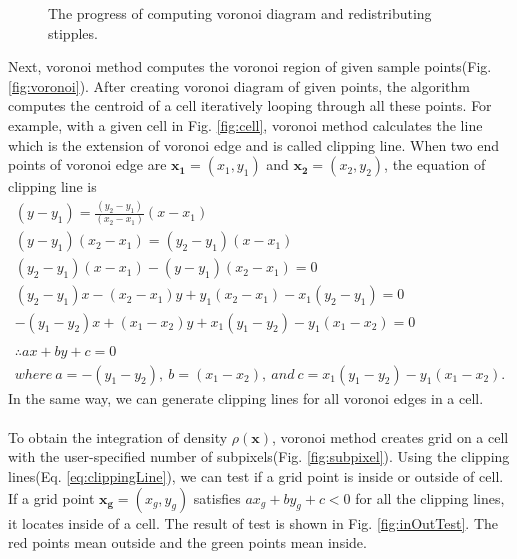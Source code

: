 \documentclass[11pt]{article}
\begin{document}
\begin{figure}[thb]
{    \label{fig:inOutTest}
  }\hspace{-3mm}
  \hspace{-3mm}
    \caption{The progress of computing voronoi diagram and redistributing stipples. \label{fig:createVoronoi}}
\end{figure}
Next, voronoi method computes the voronoi region of given sample points(Fig. \ref{fig:voronoi}).
After creating voronoi diagram of given points, the algorithm computes the centroid of a cell iteratively looping through all these points.
For example, with a given cell in Fig. \ref{fig:cell}, voronoi method calculates the line which is the extension of voronoi edge and is called clipping line.
When two end points of voronoi edge are $\mathbf{x_1}=(x_1,y_1)$ and $\mathbf{x_2}=(x_2,y_2)$, the equation of clipping line is
\begin{equation}\label{eq:clippingLine}
\begin{gathered}
(y-y_1) = \frac{(y_2-y_1)}{(x_2-x_1)}(x-x_1)\\
(y-y_1)(x_2-x_1) = (y_2-y_1)(x-x_1)\\
(y_2-y_1)(x-x_1)-(y-y_1)(x_2-x_1)= 0\\
(y_2-y_1)x-(x_2-x_1)y+y_1(x_2-x_1)-x_1(y_2-y_1)=0\\
-(y_1-y_2)x+(x_1-x_2)y+x_1(y_1-y_2)-y_1(x_1-x_2)=0\\\\
\therefore ax+by+c=0 \\where\:a=-(y_1-y_2),\:b=(x_1-x_2),\:and\:c=x_1(y_1-y_2)-y_1(x_1-x_2).
\end{gathered}
\end{equation}
In the same way, we can generate clipping lines for all voronoi edges in a cell.\\\\
To obtain the integration of density $\rho(\mathbf{x})$, voronoi method creates grid on a cell with the user-specified number of subpixels(Fig. \ref{fig:subpixel}).
Using the clipping lines(Eq. \ref{eq:clippingLine}), we can test if a grid point is inside or outside of cell. If a grid point $\mathbf{x_g}=(x_g, y_g)$ satisfies $ax_g+by_g+c<0$ for all the clipping lines, it locates inside of a cell. The result of test is shown in Fig. \ref{fig:inOutTest}. The red points mean outside and the green points mean inside.
\end{document}
